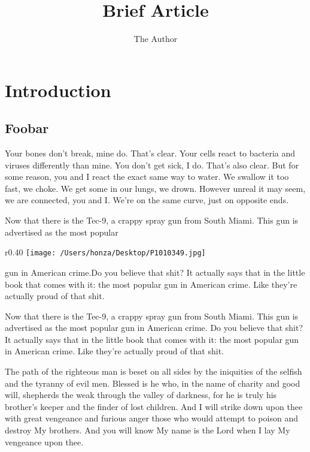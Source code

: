 \documentclass[11pt,twoside,a5paper,landscape,openright]{book}
\title{Brief Article}
\author{The Author}
\begin{document}
\dominitoc[e]
\nomtcrule
\nomtcpagenumbers
\faketableofcontents

\maketitle

\chapter{Introduction}
\section*{Foobar}
Your bones don't break, mine do. That's clear. Your cells react to bacteria and viruses differently than mine. You don't get sick, I do. That's also clear. But for some reason, you and I react the exact same way to water. We swallow it too fast, we choke. We get some in our lungs, we drown. However unreal it may seem, we are connected, you and I. We're on the same curve, just on opposite ends.

Now that there is the Tec-9, a crappy spray gun from South Miami. This gun is advertised as the most popular\begin{wrapfigure}{r}{0.40\textwidth}
  \vspace{-12pt}
  \setlength{\fboxsep}{0pt}
  \texttt{[image: /Users/honza/Desktop/P1010349.jpg]}\vspace{-25pt}
\end{wrapfigure} gun in American crime.Do you believe that shit? It actually says that in the little book that comes with it: the most popular gun in American crime. Like they're actually proud of that shit. 

Now that there is the Tec-9, a crappy spray gun from South Miami. This gun is advertised as the most popular gun in American crime. Do you believe that shit? It actually says that in the little book that comes with it: the most popular gun in American crime. Like they're actually proud of that shit. 

The path of the righteous man is beset on all sides by the iniquities of the selfish and the tyranny of evil men. Blessed is he who, in the name of charity and good will, shepherds the weak through the valley of darkness, for he is truly his brother's keeper and the finder of lost children. And I will strike down upon thee with great vengeance and furious anger those who would attempt to poison and destroy My brothers. And you will know My name is the Lord when I lay My vengeance upon thee.
\end{document}
